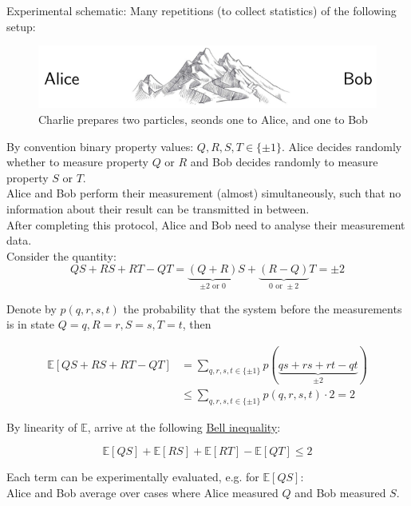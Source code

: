 Experimental schematic:  Many repetitions (to collect statistics) of the following setup:

\begin{figure}[H]
    \centering
    \includegraphics[scale=0.5]{chapters/res/alice-bob-mountains.png}
    \caption{Charlie prepares two particles, seonds one to Alice, and one to Bob
        }
\end{figure}

By convention binary property values: $Q, R, S, T \in \{\pm 1 \}$. 
Alice decides randomly whether to measure property $Q$ or $R$ and Bob decides randomly to measure 
property $S$ or $T$. \\
Alice and Bob perform their measurement (almost) simultaneously, such that no information about their
result can be transmitted in between. \\ 
After completing this protocol, Alice and Bob need to analyse their measurement data. \\
Consider the quantity:
\begin{equation}
    QS + RS + RT - QT = \underbrace{(Q + R)}_{\pm 2 \text{ or } 0} S + \underbrace{(R - Q)}_{0 \text{ or } \pm 2} T
        = \pm 2
\end{equation}

Denote by $p(q, r, s, t)$ the probability that the system before the measurements is in state 
$Q = q, R = r, S = s, T = t$, then

\begin{align}
    \mathbb{E}[QS + RS + RT - QT] 
        &= \sum_{q, r, s, t \in \{\pm 1 \}} p(\underbrace{qs + rs + rt - qt}_{\pm 2}) \\ 
        &\leq \sum_{q, r, s, t \in \{\pm 1 \}} p(q, r, s, t) \cdot 2 = 2 
\end{align}

By linearity of $\mathbb{E}$, arrive at the following \underline{Bell inequality}:

\begin{equation}
    \mathbb{E}[QS] + \mathbb{E}[RS] + \mathbb{E}[RT] - \mathbb{E}[QT]
        \leq 2
\end{equation}

Each term can be experimentally evaluated, e.g. for $\mathbb{E}[QS]$: \\
Alice and Bob average over cases where Alice measured $Q$ and Bob measured $S$. \\

